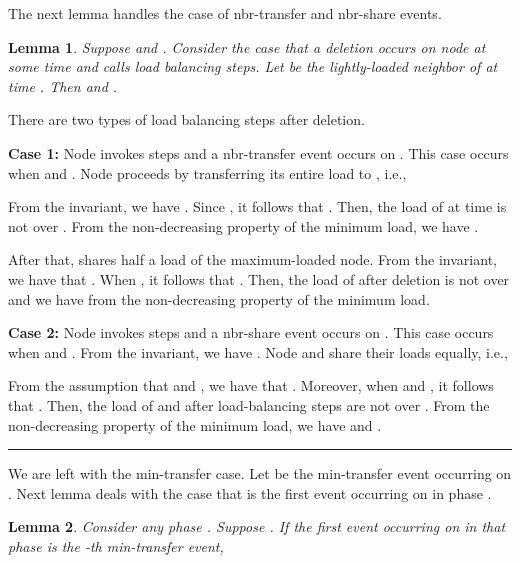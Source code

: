 \documentclass[a4paper]{article}
\newtheorem{lemma}{Lemma}
\newenvironment{proof}{{\bf Proof:}}{\hfill\rule{1.5mm}{3mm}\vspace{0.1in}}
\begin{document}
The next lemma handles the case of  nbr-transfer and nbr-share
events.

\begin{lemma}
  \label{lem:load-after-splitmax-splitnbr}
  Suppose  and . Consider the case that a deletion occurs on node
   at some time  and  calls  load balancing steps. Let 
  be the lightly-loaded neighbor of  at time . Then
   and .
\end{lemma}

\begin{proof}  
  There are two types of load balancing steps after deletion.

  \textbf{Case 1:} Node  invokes {\splitmax} steps and a
  nbr-transfer event occurs on .  This case occurs when
   and . Node 
  proceeds by transferring its entire load to , i.e., 
   
  From the invariant, we have .  Since , it follows that .  Then,
  the load of  at time  is not over . From
  the non-decreasing property of the minimum load, we have
  .  
  
  After that,  shares half a load
  of the maximum-loaded node. From the invariant, we have that
  . When , it follows that
  .  Then, the load of  after deletion is
  not over  and  we have  from the non-decreasing property of the minimum load.

  \textbf{Case 2:} Node  invokes {\splitnbr} steps and a
  nbr-share event occurs on . This case occurs when  and .  From the invariant,
  we have . Node 
  and  share their loads equally, i.e., 
  
  From the assumption that  and , we have that .  
  Moreover, when  and , it follows
  that .  Then, the load
  of  and  after load-balancing steps are not over . From the non-decreasing property of the minimum load, we have
   and .  
\end{proof}


We are left with the min-transfer case. Let  be the min-transfer
event occurring on . Next lemma deals with the case that  is the
first event occurring on  in phase .

\begin{lemma}
  \label{lem:minimum-decrease}
  Consider any phase . Suppose . If the first event
  occurring on  in that phase is the -th min-transfer event, 
  
\end{lemma}
\end{document}
